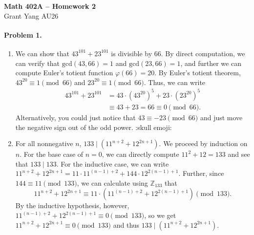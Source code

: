 \documentclass[12pt]{article}
\begin{document}
\begin{center} {\large \textbf{Math 402A -- Homework 2}} \smallskip \\ 
    Grant Yang \hspace{1em} AU26
 \end{center}

 \paragraph{Problem 1.} 
 \begin{enumerate}
 \item[a] We can show that $43^{101} + 23^{101}$ is divisible by 66. By direct computation, we can verify that $\mathrm{gcd}(43, 66) = 1$ and $\mathrm{gcd}(23, 66) = 1$, and further we can compute Euler's totient function $\varphi(66) = 20$. By Euler's totient theorem, $43^{20} \equiv 1 \pmod{66}$ and $23^{20} \equiv 1 \pmod{66}$. Thus, we can write \begin{align*}43^{101} + 23^{101} &= 43\cdot (43^{20})^5 + 23 \cdot (23^{20})^5 \\ &\equiv 43 + 23 = 66 \equiv 0 \pmod{66}.\end{align*}
 Alternatively, you could just notice that $43 \equiv -23 \pmod{66}$ and just move the negative sign out of the odd power. :skull emoji:
 \item[b] For all nonnegative $n$, $133 \mid(11^{n+2} + 12^{2n+1})$. We proceed by induction on $n$. For the base case of $n = 0$, we can directly compute $11^2 + 12 = 133$ and see that $133 \mid 133$. For the inductive case, we can write $11^{n+2} + 12^{2n+1} = 11\cdot 11^{(n-1)+2} + 144\cdot 12^{2(n-1)+1}$. Further, since $144 \equiv 11 \pmod{133}$, we can calculate using $\mathbb Z_{133}$ that \[11^{n+2} + 12^{2n+1} \equiv 11 \cdot (11^{(n-1)+2} + 12^{2(n-1)+1})\pmod{133}.
 \] By the inductive hypothesis, however, $11^{(n-1)+2} + 12^{2(n-1)+1} \equiv 0 \pmod{133}$, so we get $11^{n+2} + 12^{2n+1} \equiv 0 \pmod{133}$ and thus $133 \mid (11^{n+2} + 12^{2n+1})$.
 \end{enumerate}
\end{document}
